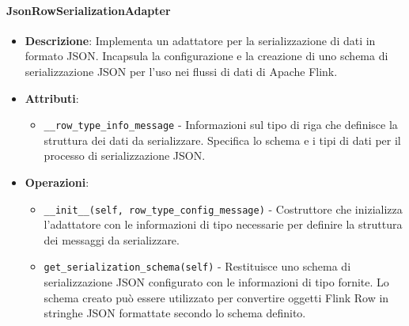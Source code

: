 \documentclass[10pt]{article}
\begin{document}
    \paragraph{JsonRowSerializationAdapter}
    \begin{itemize} 
    \item \textbf{Descrizione}: Implementa un adattatore per la serializzazione di dati in formato JSON. Incapsula la configurazione e la creazione di uno schema di serializzazione JSON per l'uso nei flussi di dati di Apache Flink.
    \item \textbf{Attributi}:
    \begin{itemize}
        \item \texttt{\_\_row\_type\_info\_message} - Informazioni sul tipo di riga che definisce la struttura dei dati da serializzare. Specifica lo schema e i tipi di dati per il processo di serializzazione JSON.
    \end{itemize}
    
    \item \textbf{Operazioni}:
    \begin{itemize}
        \item \texttt{\_\_init\_\_(self, row\_type\_config\_message)} - Costruttore che inizializza l'adattatore con le informazioni di tipo necessarie per definire la struttura dei messaggi da serializzare.
        
        \item \texttt{get\_serialization\_schema(self)} - Restituisce uno schema di serializzazione JSON configurato con le informazioni di tipo fornite. Lo schema creato può essere utilizzato per convertire oggetti Flink Row in stringhe JSON formattate secondo lo schema definito.
    \end{itemize}
    \end{itemize}
\end{document}
